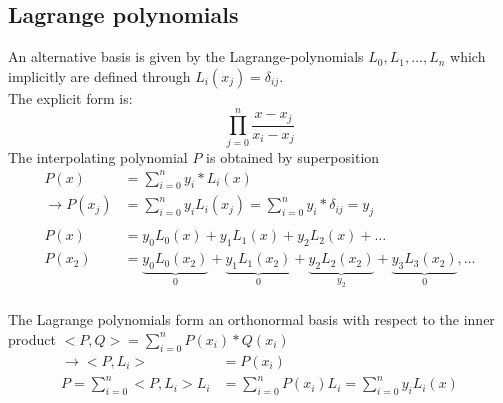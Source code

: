 \subsection{Lagrange polynomials}\label{subsec:lagrange-polynomials}
An alternative basis is given by the Lagrange-polynomials $L_0, L_1, \ldots, L_n$ which implicitly are defined through $L_i(x_j) = \delta_{ij}$.\\
The explicit form is:
\begin{equation*}
    \prod_{j=0}^n \frac{x-x_j}{x_i-x_j}
\end{equation*}
The interpolating polynomial $P$ is obtained by superposition
\begin{align*}
    P(x) &= \sum_{i=0}^{n}y_i*L_i(x)\\
    \to P(x_j)&=\sum_{i=0}^{n} y_i L_i(x_j)= \sum_{i=0}^{n} y_i * \delta_{ij} = y_j\\
    \\
    P(x) &= y_0 L_0 (x) + y_1 L_1 (x) + y_2 L_2 (x) + \ldots\\
    P(x_2) &= \underbrace{y_0 L_0
        (x_2)}_0 + \underbrace{y_1 L_1 (x_2)}_0 + \underbrace{y_2 L_2 (x_2)}_{y_2} + \underbrace{y_3 L_3 (x_2)}_0, \ldots\\
\end{align*}
\begin{remark}
    The Lagrange polynomials form an orthonormal basis with respect
    to the inner product $<P, Q>=\sum_{i=0}^{n} P(x_i) * Q(x_i)$
    \begin{align*}
        \to{} <P, L_i> &= P(x_i)\\
        P = \sum_{i=0}^n <P, L_{i}> L_i &= \sum_{i=0}^{n} P(x_i) L_i
        = \sum_{i=0}^{n} y_i L_i(x)
    \end{align*}
\end{remark}

